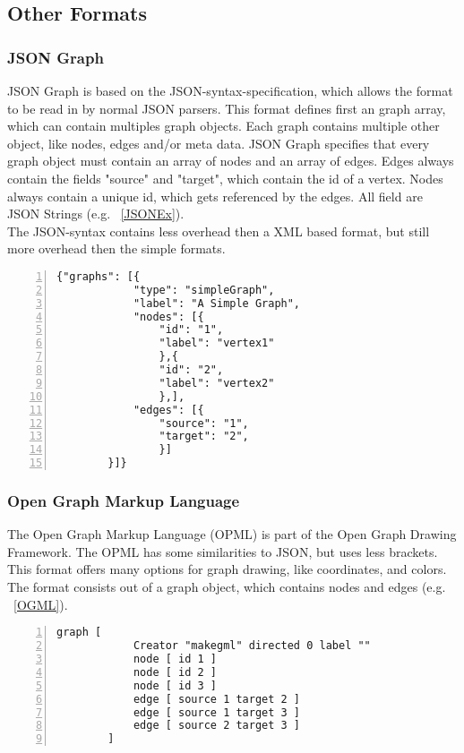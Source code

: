 \subsection{Other Formats}

\subsubsection{JSON Graph}
JSON Graph is based on the JSON-syntax-specification, which allows the format to be read in by normal JSON parsers. This format defines first an graph array, which can contain multiples graph objects. Each graph contains multiple other object, like nodes, edges and/or meta data. JSON Graph specifies that every graph object must contain an array of nodes and an array of edges. Edges always contain the fields "source" and "target", which contain the id of a vertex. Nodes always contain a unique id, which gets referenced by the edges. All field are JSON Strings (e.g. ~\ref{JSONEx})\cite{json.format,Roughan.10.03.2015}.\\
The JSON-syntax contains less overhead then a XML based format, but still more overhead then the simple formats\cite{json.format,Roughan.10.03.2015}.
\vspace{-7mm}
\begin{center}
	\begin{minipage}{.8\textwidth}
		\begin{lstlisting}[numbers=left,
		stepnumber=1,caption={A Simple Graph in JSON Graph},captionpos=b, linewidth={\textwidth}, escapeinside=||,gobble=8, label=JSONEx]
		{"graphs": [{
			"type": "simpleGraph",
			"label": "A Simple Graph",
			"nodes": [{
				"id": "1", 
				"label": "vertex1"
				},{
				"id": "2",
				"label": "vertex2"
				},],
			"edges": [{
				"source": "1", 
				"target": "2",
				}]
		}]}
		\end{lstlisting}
	\end{minipage}
\end{center}
\subsubsection{Open Graph Markup Language}
The Open Graph Markup Language (OPML) is part of the Open Graph Drawing Framework. The OPML has some similarities to JSON, but uses less brackets. This format offers many options for graph drawing, like coordinates, and colors. The format consists out of a graph object, which contains nodes and edges (e.g. ~\ref{OGML})\cite{opengraph.format}.
\begin{center}
	\begin{minipage}{.8\textwidth}
		\begin{lstlisting}[numbers=left,
		stepnumber=1,caption={A Simple Graph in Open Graph Markup Language},captionpos=b, linewidth={\textwidth}, escapeinside=||,gobble=8,label=OGML]
		graph [
			Creator "makegml" directed 0 label ""
			node [ id 1 ]
			node [ id 2 ]
			node [ id 3 ]
			edge [ source 1 target 2 ]
			edge [ source 1 target 3 ]
			edge [ source 2 target 3 ]
		]
		\end{lstlisting}
	\end{minipage}
\end{center}
